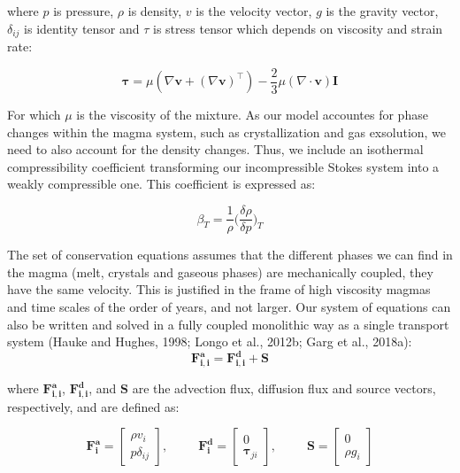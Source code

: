 where $p$ is pressure, $\rho$ is density, $v$ is the velocity vector, $g$ is the gravity vector, $\delta_{ij}$  is identity tensor and $\tau$ is stress tensor which depends on viscosity and strain rate:

\begin{equation}
	\boldsymbol{\tau} = \mu \left( \nabla \mathbf{v} + (\nabla \mathbf{v})^\top \right) - \frac{2}{3} \mu (\nabla \cdot \mathbf{v}) \mathbf{I}
\end{equation}

For which $\mu$ is the viscosity of the mixture.
As our model accountes for phase changes within the magma system, such as crystallization and gas exsolution, we need to also account for the density changes. Thus, we include an isothermal compressibility coefficient transforming our incompressible Stokes system into a weakly compressible one. This coefficient is expressed as:

\begin{equation}
	\beta_T = \frac{1}{\rho}\bigg(\frac{\delta\rho}{\delta p}\bigg)_T
\end{equation}

The set of conservation equations assumes that the different phases we can find in the magma (melt, crystals and gaseous phases) are mechanically coupled, they have the same velocity. This is justified in the frame of high viscosity magmas and time scales of the order of years, and not larger. 
Our system of equations can also be written and solved in a fully coupled monolithic way as a single transport system (Hauke and Hughes, 1998; Longo et al., 2012b; Garg et al., 2018a):
\begin{equation}
	\boldsymbol{F^{a}_{i,i}} = \boldsymbol{F^{d}_{i,i}} + \boldsymbol{S}
\end{equation}


where $\boldsymbol{F_{i,i}^{a}}$, $\boldsymbol{F_{i,i}^{d}}$, and $\boldsymbol{S}$ are the advection flux, diffusion flux and source vectors, respectively, and are defined as:

\begin{equation}
	\boldsymbol{F^{a}_{i}} = 
	\begin{bmatrix}
		\rho v_i\\
		p\delta_{ij} 
	\end{bmatrix}, ~~~~~~~~~~~
	\boldsymbol{F^{d}_{i}} = 
	\begin{bmatrix}
		0\\
		\mathbf{\tau}_{ji}
	\end{bmatrix}, ~~~~~~~~~~~
	\boldsymbol{S} =
	\begin{bmatrix}
		0\\
		\rho g_i
	\end{bmatrix}
\end{equation}

